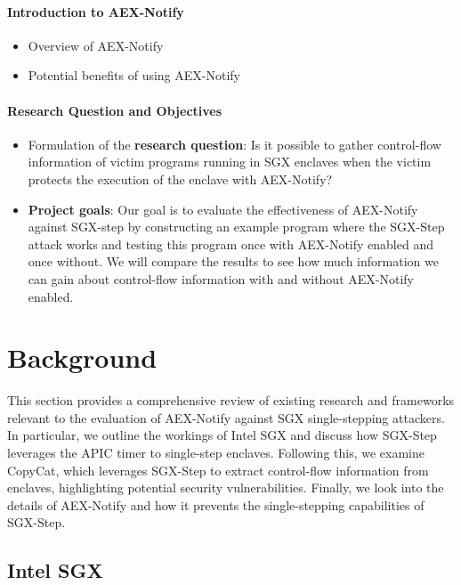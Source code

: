 \documentclass{llncs}
\begin{document}
\paragraph{Introduction to AEX-Notify}
\begin{itemize}
  \item Overview of AEX-Notify
  \item Potential benefits of using AEX-Notify
\end{itemize}

\paragraph{Research Question and Objectives}
\begin{itemize}
  \item Formulation of the \textbf{research question}:
    Is it possible to gather control-flow information of victim programs running
    in SGX enclaves when the victim protects the execution of the enclave with
    AEX-Notify?
  \item \textbf{Project goals}:
    Our goal is to evaluate the effectiveness of AEX-Notify against SGX-step by
    constructing an example program where the SGX-Step attack works and testing
    this program once with AEX-Notify enabled and once without. We will compare
    the results to see how much information we can gain about control-flow
    information with and without AEX-Notify enabled.
\end{itemize}

\section{Background}

This section provides a comprehensive review of existing research and frameworks
relevant to the evaluation of AEX-Notify against SGX single-stepping attackers.
In particular, we outline the workings of Intel SGX and
discuss how SGX-Step leverages the APIC timer to single-step enclaves.
Following this, we examine CopyCat, which leverages SGX-Step to extract
control-flow information from enclaves, highlighting potential security
vulnerabilities.
Finally, we look into the details of AEX-Notify and
how it prevents the single-stepping capabilities of SGX-Step.

\subsection{Intel SGX}
\end{document}
